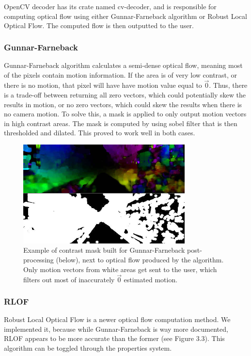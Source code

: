 \documentclass[11pt,english]{report}
\begin{document}
OpenCV decoder has its crate named cv-decoder, and is responsible for computing optical flow using either Gunnar-Farneback algorithm\cite{Farnebck2003TwoFrameME} or Robust Local Optical Flow. The computed flow is then outputted to the user.

\subsubsection{Gunnar-Farneback}

Gunnar-Farneback algorithm calculates a semi-dense optical flow, meaning most of the pixels contain motion information. If the area is of very low contrast, or there is no motion, that pixel will have have motion value equal to $\overrightarrow{0}$. Thus, there is a trade-off between returning all zero vectors, which could potentially skew the results in motion, or no zero vectors, which could skew the results when there is no camera motion. To solve this, a mask is applied to only output motion vectors in high contrast areas. The mask is computed by using sobel filter that is then thresholded and dilated. This proved to work well in both cases.

\begin{figure}[!ht]
	\centering
	\includegraphics[width=250pt]{docs/report/gunnar-farneback-mask.jpg}
	\caption{\centering Example of contrast mask built for Gunnar-Farneback post-processing (below), next to optical flow produced by the algorithm. Only motion vectors from white areas get sent to the user, which filters out most of inaccurately $\overrightarrow{0}$ estimated motion.}
\end{figure}

\subsubsection{RLOF}

Robust Local Optical Flow is a newer optical flow computation method. We implemented it, because while Gunnar-Farneback is way more documented, RLOF appears to be more accurate than the former (see Figure 3.3). This algorithm can be toggled through the properties system.
\end{document}
